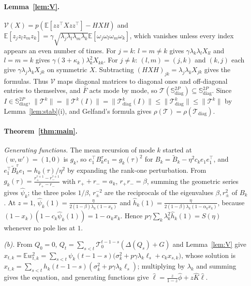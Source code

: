 \documentclass[11pt]{article}
\theoremstyle{remark}
\newcommand{\E}{\mathbb{E}}
\newcommand{\T}{\mathcal T}
\newcommand{\V}{\mathcal V}
\begin{document}
\paragraph{Lemma~\ref{lem:V}.}
$\V(X)=p(\E[zz^\top Xzz^\top]-HXH)$ and $\E[z_jz_lz_mz_k]=\gamma\sqrt{\lambda_j\lambda_l\lambda_m\lambda_k}\E[\omega_j\omega_l\omega_m\omega_k]$, which vanishes unless every index appears an even number of times. For $j=k$: $l=m\ne k$ gives $\gamma\lambda_k\lambda_lX_{ll}$ and $l=m=k$ gives $\gamma(3+\kappa_k)\lambda_k^2X_{kk}$. For $j\ne k$: $(l,m)=(j,k)$ and $(k,j)$ each give $\gamma\lambda_j\lambda_kX_{jk}$ on symmetric $X$. Subtracting $(HXH)_{jk}=\lambda_j\lambda_kX_{jk}$ gives the formulas. Thus $\V$ maps diagonal matrices to diagonal ones and off-diagonal entries to themselves, and $\bar F$ acts mode by mode, so $\T(\mathbb S^{2P}_{\mathrm{diag}})\subseteq\mathbb S^{2P}_{\mathrm{diag}}$. Since $I\in\mathbb S^{2P}_{\mathrm{diag}}$, $\|\T^k\|=\|\T^k(I)\|=\|\T_{\mathrm{diag}}^k(I)\|\le\|\T^k_{\mathrm{diag}}\|\le\|\T^k\|$ by Lemma~\ref{lem:stab}(i), and Gelfand's formula gives $\rho(\T)=\rho(\T_{\mathrm{diag}})$.

\paragraph{Theorem~\ref{thm:main}.}
\emph{Generating functions.} The mean recursion of mode $k$ started at $(w,w')=(1,0)$ is $g_k$, so $e_1^\top B_k^\tau e_1=g_k(\tau)^2$ for $B_k=\widetilde B_k-\eta^2c_ke_1e_1^\top$, and $e_1^\top\widetilde B_k^\tau e_1=h_k(\tau)/\eta^2$ by expanding the rank-one perturbation. From $g_k(\tau)=\frac{r_+^{\tau+1}-r_-^{\tau+1}}{r_+-r_-}$ with $r_++r_-=a_k$, $r_+r_-=\beta$, summing the geometric series gives $\widehat\psi_k$; the three poles $1/\beta$, $r_\pm^{-2}$ are the reciprocals of the eigenvalues $\beta,r_\pm^2$ of $B_k$. At $z=1$, $\widehat\psi_k(1)=\frac{\eta}{2(1-\beta)\lambda_k(1-x_k)}$ and $\widehat h_k(1)=\frac{\eta}{2(1-\beta)\lambda_k(1-\alpha_kx_k)}$, because $(1-x_k)(1-c_k\widehat\psi_k(1))=1-\alpha_kx_k$. Hence $p\gamma\sum_k\lambda_k^2\widehat h_k(1)=S(\eta)$ whenever no pole lies at $1$.

\emph{(b).} From $Q_0=0$, $Q_t=\sum_{s<t}\T_0^{t-1-s}(\Delta(Q_s)+G)$ and Lemma~\ref{lem:V} give $x_{t,k}=\E w_{t,k}^2=\sum_{s<t}\psi_k(t-1-s)\big(\sigma_k^2+p\gamma\lambda_k\ell_s+c_kx_{s,k}\big)$, whose solution is $x_{t,k}=\sum_{s<t}h_k(t-1-s)(\sigma_k^2+p\gamma\lambda_k\ell_s)$; multiplying by $\lambda_k$ and summing gives the equation, and generating functions give $\widehat\ell=\frac{z}{1-z}\widehat\phi+z\widehat K\widehat\ell$.
\end{document}
